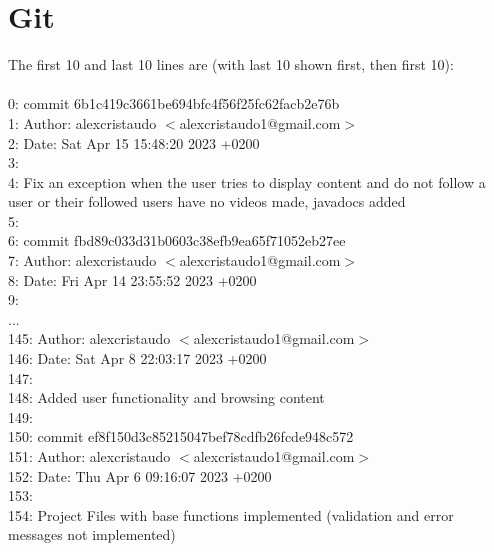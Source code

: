 \documentclass{assignment}
\begin{document}
\newpage
\section{Git}
The first 10 and last 10 lines are (with last 10 shown first, then first 10): \\ \\
0: commit 6b1c419c3661be694bfc4f56f25fc62facb2e76b \\
1: Author: alexcristaudo $<$alexcristaudo1@gmail.com$>$ \\
2: Date:   Sat Apr 15 15:48:20 2023 +0200 \\
3: \\
4: Fix an exception when the user tries to display content and do not follow a user or their followed users have no videos made, javadocs added \\
5: \\
6: commit fbd89c033d31b0603c38efb9ea65f71052eb27ee \\
7: Author: alexcristaudo $<$alexcristaudo1@gmail.com$>$ \\
8: Date:   Fri Apr 14 23:55:52 2023 +0200 \\
9: \\
... \\
145: Author: alexcristaudo $<$alexcristaudo1@gmail.com$>$ \\
146: Date:   Sat Apr 8 22:03:17 2023 +0200 \\
147: \\ 
148: Added user functionality and browsing content \\
149: \\ 
150: commit ef8f150d3c85215047bef78cdfb26fcde948c572 \\
151: Author: alexcristaudo $<$alexcristaudo1@gmail.com$>$ \\ 
152: Date:   Thu Apr 6 09:16:07 2023 +0200 \\ 
153: \\ 
154: Project Files with base functions implemented (validation and error messages not implemented)
\end{document}
